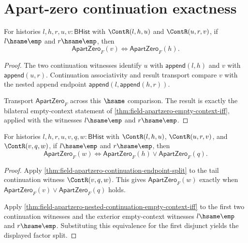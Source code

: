\section{Apart-zero continuation exactness}
\label{sec:field-apartzero-continuation-exactness}

\begin{theorem}
\label{thm:field-apartzero-nested-continuation-empty-context-iff}
For histories $l,h,r,u,v:\mathsf{BHist}$ with $\ContR(l,h,u)$ and
$\ContR(u,r,v)$, if $l\hsame\emp$ and $r\hsame\emp$, then
$$
\mathsf{ApartZero}_F(v)
\Longleftrightarrow
\mathsf{ApartZero}_F(h).
$$
\end{theorem}
\begin{proof}
The two continuation witnesses identify $u$ with $\mathsf{append}(l,h)$ and
$v$ with $\mathsf{append}(u,r)$. Continuation associativity and result
transport compare $v$ with the nested append endpoint
$\mathsf{append}(l,\mathsf{append}(h,r))$.

Transport $\mathsf{ApartZero}_F$ across this $\hsame$ comparison. The result
is exactly the bilateral empty-context statement of
\autoref{thm:field-apartzero-empty-context-iff}, applied with the witnesses
$l\hsame\emp$ and $r\hsame\emp$.
\end{proof}

\begin{theorem}
\label{thm:field-apartzero-nested-continuation-factor-split}
For histories $l,h,r,u,v,q,w:\mathsf{BHist}$ with $\ContR(l,h,u)$,
$\ContR(u,r,v)$, and $\ContR(v,q,w)$, if $l\hsame\emp$ and $r\hsame\emp$,
then
$$
\mathsf{ApartZero}_F(w)
\Longleftrightarrow
\mathsf{ApartZero}_F(h)\lor\mathsf{ApartZero}_F(q).
$$
\end{theorem}
\begin{proof}
Apply \autoref{thm:field-apartzero-continuation-endpoint-split} to the tail
continuation witness $\ContR(v,q,w)$. This gives
$\mathsf{ApartZero}_F(w)$ exactly when
$\mathsf{ApartZero}_F(v)\lor\mathsf{ApartZero}_F(q)$ holds.

Apply
\autoref{thm:field-apartzero-nested-continuation-empty-context-iff} to the
first two continuation witnesses and the exterior empty-context witnesses
$l\hsame\emp$ and $r\hsame\emp$. Substituting this equivalence for the first
disjunct yields the displayed factor split.
\end{proof}

